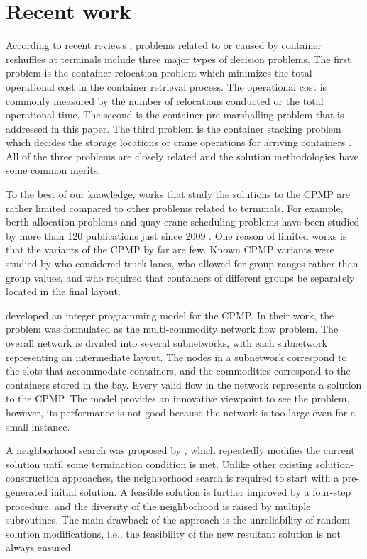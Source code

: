 \documentclass[review,3p,times,12pt,number]{elsarticle}\usepackage{amsmath}\usepackage{amssymb}
\renewcommand{\citet}[1]{\citeauthor{#1} \citep{#1}}
\begin{document}
\section{Recent work}
\label{sec:literature}

According to recent reviews \citep{carlo2014,lehnfeld2014}, problems related to or caused by container reshuffles at terminals include three major types of decision problems. The first problem is the container relocation problem \citep{Jovanovic2014achain,jin2015} which minimizes the total operational cost in the container retrieval process. The operational cost is commonly measured by the number of relocations conducted or the total operational time. The second is the container pre-marshalling problem that is addressed in this paper. The third problem is the container stacking problem which decides the storage locations or crane operations for arriving containers \citep{Dayama2014}. All of the three problems are closely related and the solution methodologies have some common merits.



To the best of our knowledge, works that study the solutions to the CPMP are rather limited compared to other problems related to terminals. For example, berth allocation problems and quay crane scheduling problems have been studied by more than 120 publications just since 2009 \citep{Bierwirth2015}. One reason of limited works is that the variants of the CPMP by far are few. Known CPMP variants were studied by \citet{wang2015} who considered truck lanes, \citet{rendl2013} who allowed for group ranges rather than group values, and \citet{Huang2012} who required that containers of different groups be separately located in the final layout.



\citet{lee2007} developed an integer programming model for the CPMP\@. In their work, the problem was formulated as the multi-commodity network flow problem. The overall network is divided into several subnetworks, with each subnetwork representing an intermediate layout. The nodes in a subnetwork correspond to the slots that accommodate containers, and the commodities correspond to the containers stored in the bay. Every valid flow in the network represents a solution to the CPMP\@. The model provides an innovative viewpoint to see the problem, however, its performance is not good because the network is too large even for a small instance.

A neighborhood search was proposed by \citet{lee2009}, which repeatedly modifies the current solution until some termination condition is met. Unlike other existing solution-construction approaches, the neighborhood search is required to start with a pre-generated initial solution.
A feasible solution is further improved by a four-step procedure, and the diversity of the neighborhood is raised by multiple subroutines. The main drawback of the approach is the unreliability of random solution modifications, i.e., the feasibility of the new resultant solution is not always ensured.
\end{document}
